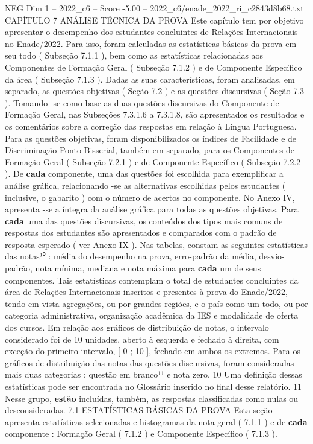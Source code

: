 \begin{textsample}{NEG Dim 1 – 2022\_c6 – Score -5.00 – 2022\_c6/enade\_2022\_ri\_c2843d8b68.txt}  \label{ex:f1_neg_190}
CAPÍTULO 7 ANÁLISE TÉCNICA DA PROVA Este capítulo tem por objetivo apresentar o desempenho dos estudantes concluintes de Relações Internacionais no Enade/2022.
Para isso, foram calculadas as estatísticas básicas da prova em seu todo ( Subseção 7.1.1 ), bem como as estatísticas relacionadas aos Componentes de Formação Geral ( Subseção 7.1.2 ) e de Componente Específico da área ( Subseção 7.1.3 ).
Dadas as suas características, foram analisadas, em separado, as questões objetivas ( Seção 7.2 ) e as questões discursivas ( Seção 7.3 ).
Tomando -se como base as duas questões discursivas do Componente de Formação Geral, nas Subseções 7.3.1.6 a 7.3.1.8, são apresentados os resultados e os comentários sobre a correção das respostas em relação à Língua Portuguesa.
Para as questões objetivas, foram disponibilizados os índices de Facilidade e de Discriminação Ponto-Bisserial, também em separado, para os Componentes de Formação Geral ( Subseção 7.2.1 ) e de Componente Específico ( Subseção 7.2.2 ).
De \textbf{cada} componente, uma das questões foi escolhida para exemplificar a análise gráfica, relacionando -se as alternativas escolhidas pelos estudantes ( inclusive, o gabarito ) com o número de acertos no componente.
No Anexo IV, apresenta -se a íntegra da análise gráfica para todas as questões objetivas.
Para \textbf{cada} uma das questões discursivas, os conteúdos dos tipos mais comuns de respostas dos estudantes são apresentados e comparados com o padrão de resposta esperado ( ver Anexo IX ).
Nas tabelas, constam as seguintes estatísticas das notas¹⁰ : média do desempenho na prova, erro-padrão da média, desvio-padrão, nota mínima, mediana e nota máxima para \textbf{cada} um de seus componentes.
Tais estatísticas contemplam o total de estudantes concluintes da área de Relações Internacionais inscritos e presentes à prova do Enade/2022, tendo em vista agregações, ou por grandes regiões, e o país como um todo, ou por categoria administrativa, organização acadêmica da IES e modalidade de oferta dos cursos.
Em relação aos gráficos de distribuição de notas, o intervalo considerado foi de 10 unidades, aberto à esquerda e fechado à direita, com exceção do primeiro intervalo, [ 0 ; 10 ], fechado em ambos os extremos.
Para os gráficos de distribuição das notas das questões discursivas, foram consideradas mais duas categorias : questão em branco¹¹ e nota zero. 10 Uma definição dessas estatísticas pode ser encontrada no Glossário inserido no final desse relatório. 11 Nesse grupo, \textbf{estão} incluídas, também, as respostas classificadas como nulas ou desconsideradas. 7.1 ESTATÍSTICAS BÁSICAS DA PROVA Esta seção apresenta estatísticas selecionadas e histogramas da nota geral ( 7.1.1 ) e de \textbf{cada} componente : Formação Geral ( 7.1.2 ) e Componente Específico ( 7.1.3 ).

\end{textsample}
